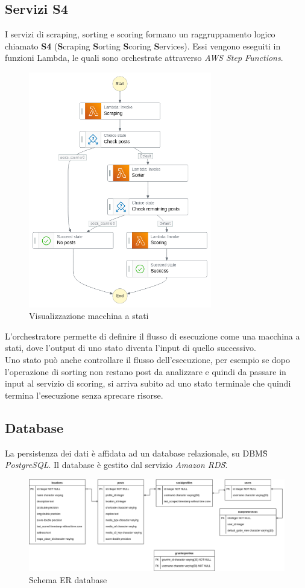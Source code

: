 \subsection{Servizi S4}
I servizi di scraping, sorting e scoring formano un raggruppamento logico chiamato \textbf{S4} (\textbf{S}craping \textbf{S}orting \textbf{S}coring \textbf{S}ervices).
Essi vengono eseguiti in funzioni Lambda, le quali sono orchestrate attraverso \textit{AWS Step Functions}.
\begin{figure}[H]
    \includegraphics[width=8cm]{sezioni/images/stepfunctions_graph.png}
    \centering
    \caption{Visualizzazione macchina a stati}
\end{figure}
\aCapo{}
L'orchestratore permette di definire il flusso di esecuzione come una macchina a stati, dove l'output di uno stato
diventa l'input di quello successivo.\\
Uno stato può anche controllare il flusso dell'esecuzione, per esempio se dopo
l'operazione di sorting non restano post da analizzare e quindi da passare in input al servizio di scoring, si arriva
subito ad uno stato terminale che quindi termina l'esecuzione senza sprecare risorse.

\newpage

\subsection{Database}
La persistenza dei dati è affidata ad un database relazionale, su DBMS\G{} \textit{PostgreSQL}.
Il database è gestito dal servizio \textit{Amazon RDS}\G.
\begin{figure}[H]
    \includegraphics[width=15cm]{sezioni/images/db_er.png}
    \centering
    \caption{Schema ER database}
\end{figure}

